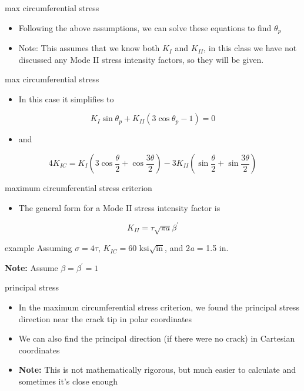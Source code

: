 \documentclass[
  letterpaper,
  ignorenonframetext,
  aspectratio=43,
  handout,
  12pt]{beamer}
\providecommand{\tightlist}{%
  \setlength{\itemsep}{0pt}\setlength{\parskip}{0pt}}
\providecommand{\tightlist}{%
\setlength{\itemsep}{0pt}\setlength{\parskip}{0pt}}
\begin{document}
\begin{frame}{max circumferential stress}
\protect\hypertarget{max-circumferential-stress-2}{}
\begin{itemize}
\tightlist
\item
  Following the above assumptions, we can solve these equations to find
  \(\theta_p\)
\item
  Note: This assumes that we know both \(K_I\) and \(K_{II}\), in this
  class we have not discussed any Mode II stress intensity factors, so
  they will be given.
\end{itemize}
\end{frame}

\begin{frame}{max circumferential stress}
\protect\hypertarget{max-circumferential-stress-3}{}
\begin{itemize}
\tightlist
\item
  In this case it simplifies to
\end{itemize}

\[K_I \sin \theta_p + K_{II} (3\cos \theta_p -1) = 0\]

\begin{itemize}
\tightlist
\item
  and
\end{itemize}

\[4K_{IC} = K_I\left(3\cos \frac{\theta}{2} + \cos \frac{3\theta}{2}\right) - 3K_{II}\left(\sin \frac{\theta}{2} + \sin \frac{3\theta}{2}\right)\]
\end{frame}

\begin{frame}{maximum circumferential stress criterion}
\protect\hypertarget{maximum-circumferential-stress-criterion}{}
\begin{itemize}
\tightlist
\item
  The general form for a Mode II stress intensity factor is
\end{itemize}

\[K_{II} = \tau \sqrt{\pi a} \beta^\prime\]
\end{frame}

\begin{frame}{example}
\protect\hypertarget{example-1}{}
Assuming \(\sigma = 4\tau\),
\(K_{IC} = 60 \text{ ksi} \sqrt{\text{in}}\), and 2\emph{a} = 1.5 in.

\textbf{Note:} Assume \(\beta = \beta^\prime = 1\)
\end{frame}

\begin{frame}{principal stress}
\protect\hypertarget{principal-stress}{}
\begin{itemize}
\tightlist
\item
  In the maximum circumferential stress criterion, we found the
  principal stress direction near the crack tip in polar coordinates
\item
  We can also find the principal direction (if there were no crack) in
  Cartesian coordinates
\item
  \textbf{Note:} This is not mathematically rigorous, but much easier to
  calculate and sometimes it's close enough
\end{itemize}
\end{frame}
\end{document}
